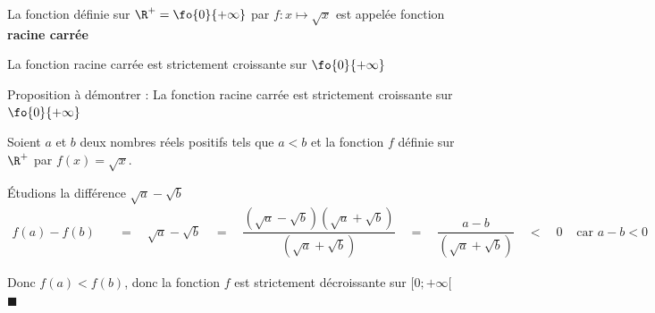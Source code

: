 \begin{defi}{}{}
La fonction définie sur $\R^+ = \fo{0}{+\infty}$ par  $f: x \longmapsto \sqrt{x}$ est appelée fonction \textbf{racine carrée}
\end{defi}

\medskip
\begin{minipage}{8cm}
\begin{center}
\end{center}
\end{minipage}
\begin{minipage}{8cm}
\begin{center}
\end{center}
\end{minipage}

\begin{prop}{}{}
La fonction racine carrée est strictement croissante sur $\fo{0}{+\infty}$
\end{prop}

\begin{deme}{}{}
Proposition à démontrer : \og La fonction racine carrée est strictement croissante sur $\fo{0}{+\infty}$ \fg{} 

\medskip
\noindent Soient $a$ et $b$ deux nombres réels positifs tels que $a<b$ et la fonction $f$ définie sur $\R^+$ par $f(x)=\sqrt{x}$.

\medskip
\noindent Étudions la différence $\sqrt{a}-\sqrt{b}$
\begin{align*}
f(a)- f(b) \quad &= \quad \sqrt{a}-\sqrt{b} \quad = \quad \dfrac{\left(\sqrt{a}-\sqrt{b}\right)\left(\sqrt{a}+\sqrt{b}\right)}{\left(\sqrt{a}+\sqrt{b}\right)} \quad = \quad \dfrac{a-b}{\left(\sqrt{a}+\sqrt{b}\right)} \quad < \quad 0 &\text{ car } a-b <0
\end{align*} 

\noindent Donc $f(a)< f(b)$, donc la fonction $f$ est strictement décroissante sur $[0;+\infty[$\hfill $\blacksquare$
\end{deme}

